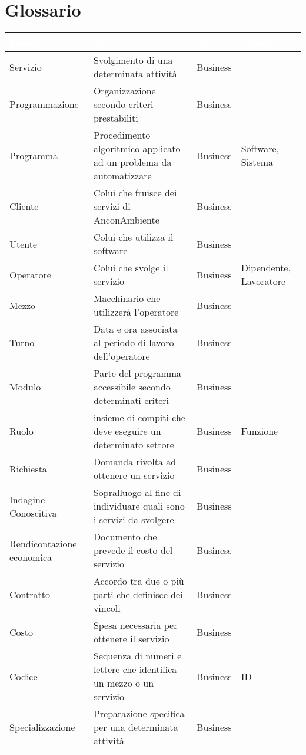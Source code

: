 \documentclass[green, fancy, 11pt]{elegantbook}
\begin{document}
\section{Glossario}
{
	\begin{tabular}{|p{}|p{6cm}|l|p{4cm}|}
		\hline
		\rowcolor{DarkGreen}
		\textbf{\textcolor{white}{Termine}} & \textbf{\textcolor{white}{Descrizione}} & \textbf{\textcolor{white}{Tipo}} & \textbf{\textcolor{white}{Sinonimo}}\\
		\hline
		Servizio & Svolgimento di una determinata attività & Business & \\
		\hline
		Programmazione &Organizzazione secondo criteri prestabiliti &Business&\\
		\hline
		Programma & Procedimento algoritmico applicato ad un problema da automatizzare & Business & Software, Sistema\\
		\hline
		Cliente &Colui che fruisce dei servizi di AnconAmbiente &Business&\\
		\hline
		Utente & Colui che utilizza il software&Business&\\
		\hline
		Operatore & Colui che svolge il servizio& Business& Dipendente, Lavoratore\\
		\hline
		Mezzo & Macchinario che utilizzerà l'operatore&Business&\\
		\hline
		Turno & Data e ora associata al periodo di lavoro dell'operatore&Business&\\
		\hline
		Modulo&Parte del programma accessibile secondo determinati criteri&Business&\\
		\hline
		Ruolo &insieme di compiti che deve eseguire un determinato settore &Business& Funzione\\
		\hline
		Richiesta &Domanda rivolta ad ottenere un servizio& Business &\\
		\hline
		Indagine Conoscitiva &Sopralluogo al fine di individuare quali sono i servizi da svolgere &Business&\\ 
		\hline
		Rendicontazione economica& Documento che prevede il costo del servizio &Business&\\
		\hline
		Contratto &Accordo tra due o più parti che definisce dei vincoli &Business&\\
		\hline
		Costo & Spesa necessaria per ottenere il servizio &Business&\\
		\hline
		Codice & Sequenza di numeri e lettere che identifica un mezzo o un servizio &Business&ID\\ 
		\hline
		Specializzazione &Preparazione specifica per una determinata attività &Business& \\

\end{tabular}}
\end{document}
